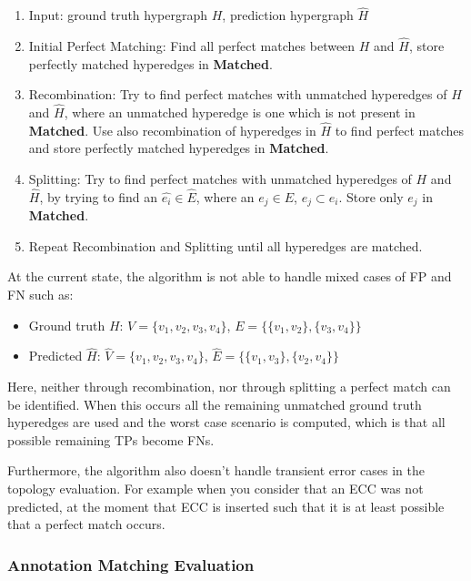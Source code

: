 \begin{enumerate}
    \item Input: ground truth hypergraph $H$, prediction hypergraph $\hat{H}$
    \item Initial Perfect Matching: Find all perfect matches between $H$ and $\hat{H}$, store perfectly matched hyperedges in \textbf{Matched}.
    \item Recombination: Try to find perfect matches with unmatched hyperedges of $H$ and $\hat{H}$, where an unmatched hyperedge is one which is not present in \textbf{Matched}.
    Use also recombination of hyperedges in $\hat{H}$ to find perfect matches and store perfectly matched hyperedges in \textbf{Matched}.
    \item Splitting: Try to find perfect matches with unmatched hyperedges of $H$ and $\hat{H}$, by trying to find an $\hat{e_i} \in \hat{E}$, where an $e_j \in E$, $e_j \subset e_i$.
    Store only $e_j$ in \textbf{Matched}.
    \item Repeat Recombination and Splitting until all hyperedges are matched.
\end{enumerate}

At the current state, the algorithm is not able to handle mixed cases of \ac{FP} and \ac{FN} such as:

\begin{itemize}
    \item Ground truth $H$: $V = \{v_1, v_2, v_3, v_4\}$, $E = \{\{v_1, v_2\}, \{v_3, v_4\}\}$
    \item Predicted $\hat{H}$: $\hat{V} = \{v_1, v_2, v_3, v_4\}$, $\hat{E} = \{\{v_1, v_3\}, \{v_2, v_4\}\}$
\end{itemize}

Here, neither through recombination, nor through splitting a perfect match can be identified.
When this occurs all the remaining unmatched ground truth hyperedges are used and the worst case scenario is computed, which is that all possible remaining \acp{TP} become \acp{FN}.

Furthermore, the algorithm also doesn't handle transient error cases in the topology evaluation.
For example when you consider that an \ac{ECC} was not predicted, at the moment that \ac{ECC} is inserted such that it is at least possible that a perfect match occurs.


\subsubsection{Annotation Matching Evaluation}


